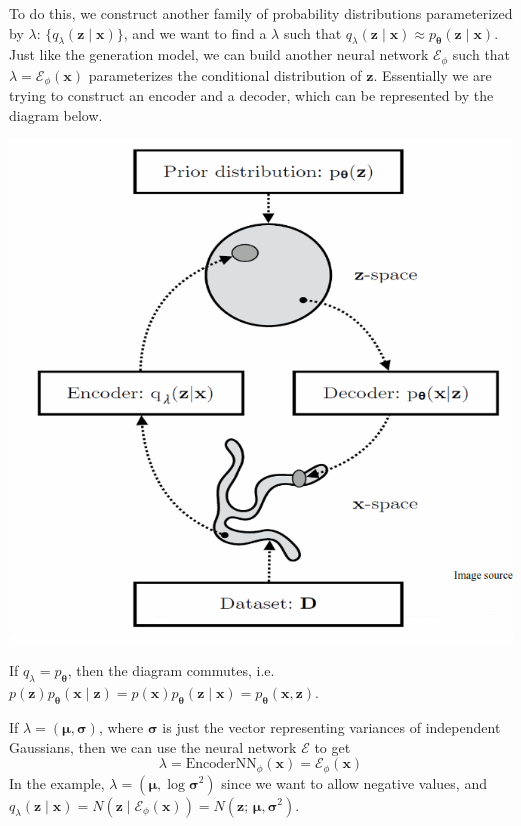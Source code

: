 \documentclass{article}
\begin{document}
    To do this, we construct another family of probability distributions parameterized by $\lambda$: $\{ q_{\lambda} (\mathbf{z} \mid \mathbf{x})\}$, and we want to find a $\lambda$ such that $q_{\lambda} (\mathbf{z} \mid \mathbf{x}) \approx p_{\boldsymbol{\theta}} (\mathbf{z} \mid \mathbf{x})$. Just like the generation model, we can build another neural network $\mathcal{E}_{\phi}$ such that $\lambda = \mathcal{E}_{\phi} (\mathbf{x})$ parameterizes the conditional distribution of $\mathbf{z}$. Essentially we are trying to construct an encoder and a decoder, which can be represented by the diagram below. 
    \begin{center}
        \includegraphics[scale=0.4]{img/08_VAE/VAE_framework.png}
    \end{center}
    If $q_{\lambda} = p_{\boldsymbol{\theta}}$, then the diagram commutes, i.e. $p(\mathbf{z}) p_{\boldsymbol{\theta}}(\mathbf{x} \mid \mathbf{z}) = p(\mathbf{x}) p_{\boldsymbol{\theta}}(\mathbf{z} \mid \mathbf{x}) = p_{\boldsymbol{\theta}} (\mathbf{x}, \mathbf{z})$. 
     
    \begin{example}
        If $\lambda = (\boldsymbol{\mu}, \boldsymbol{\sigma})$, where $\boldsymbol{\sigma}$ is just the vector representing variances of independent Gaussians, then we can use the neural network $\mathcal{E}$ to get 
        \[\lambda = \mathrm{EncoderNN}_{\phi} ( \mathbf{x}) = \mathcal{E}_{\phi} (\mathbf{x})\]
        In the example, $\lambda = (\boldsymbol{\mu}, \log \boldsymbol{\sigma}^2 )$ since we want to allow negative values, and $q_{\lambda} (\mathbf{z} \mid \mathbf{x}) = N(\mathbf{z} \mid \mathcal{E}_{\phi} (\mathbf{x})) = N(\mathbf{z} ; \, \boldsymbol{\mu} , \boldsymbol{\sigma}^2)$. 
    \end{example}
\end{document}
